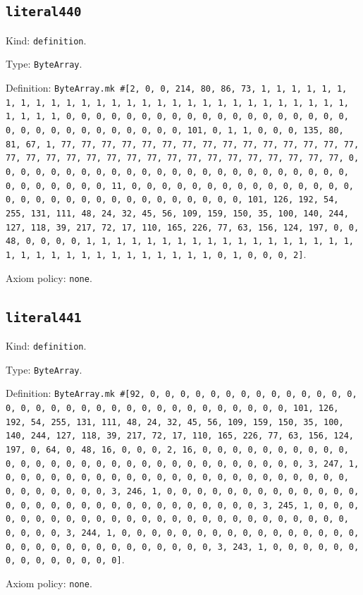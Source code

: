 \documentclass[11pt]{article}
\begin{document}
\subsection*{\texttt{literal440}}
\noindent Kind: \texttt{definition}.\par
\noindent Type: \texttt{ByteArray}.\par
\noindent Definition: \texttt{ByteArray.mk \#[2, 0, 0, 214, 80, 86, 73, 1, 1, 1, 1, 1, 1, 1, 1, 1, 1, 1, 1, 1, 1, 1, 1, 1, 1, 1, 1, 1, 1, 1, 1, 1, 1, 1, 1, 1, 1, 1, 1, 1, 0, 0, 0, 0, 0, 0, 0, 0, 0, 0, 0, 0, 0, 0, 0, 0, 0, 0, 0, 0, 0, 0, 0, 0, 0, 0, 0, 0, 0, 0, 0, 101, 0, 1, 1, 0, 0, 0, 135, 80, 81, 67, 1, 77, 77, 77, 77, 77, 77, 77, 77, 77, 77, 77, 77, 77, 77, 77, 77, 77, 77, 77, 77, 77, 77, 77, 77, 77, 77, 77, 77, 77, 77, 77, 77, 0, 0, 0, 0, 0, 0, 0, 0, 0, 0, 0, 0, 0, 0, 0, 0, 0, 0, 0, 0, 0, 0, 0, 0, 0, 0, 0, 0, 0, 0, 0, 11, 0, 0, 0, 0, 0, 0, 0, 0, 0, 0, 0, 0, 0, 0, 0, 0, 0, 0, 0, 0, 0, 0, 0, 0, 0, 0, 0, 0, 0, 0, 0, 101, 126, 192, 54, 255, 131, 111, 48, 24, 32, 45, 56, 109, 159, 150, 35, 100, 140, 244, 127, 118, 39, 217, 72, 17, 110, 165, 226, 77, 63, 156, 124, 197, 0, 0, 48, 0, 0, 0, 0, 1, 1, 1, 1, 1, 1, 1, 1, 1, 1, 1, 1, 1, 1, 1, 1, 1, 1, 1, 1, 1, 1, 1, 1, 1, 1, 1, 1, 1, 1, 1, 1, 0, 1, 0, 0, 0, 2]}.\par
\noindent Axiom policy: \texttt{none}.\par
\subsection*{\texttt{literal441}}
\noindent Kind: \texttt{definition}.\par
\noindent Type: \texttt{ByteArray}.\par
\noindent Definition: \texttt{ByteArray.mk \#[92, 0, 0, 0, 0, 0, 0, 0, 0, 0, 0, 0, 0, 0, 0, 0, 0, 0, 0, 0, 0, 0, 0, 0, 0, 0, 0, 0, 0, 0, 0, 0, 0, 0, 101, 126, 192, 54, 255, 131, 111, 48, 24, 32, 45, 56, 109, 159, 150, 35, 100, 140, 244, 127, 118, 39, 217, 72, 17, 110, 165, 226, 77, 63, 156, 124, 197, 0, 64, 0, 48, 16, 0, 0, 0, 2, 16, 0, 0, 0, 0, 0, 0, 0, 0, 0, 0, 0, 0, 0, 0, 0, 0, 0, 0, 0, 0, 0, 0, 0, 0, 0, 0, 0, 0, 0, 0, 3, 247, 1, 0, 0, 0, 0, 0, 0, 0, 0, 0, 0, 0, 0, 0, 0, 0, 0, 0, 0, 0, 0, 0, 0, 0, 0, 0, 0, 0, 0, 0, 0, 3, 246, 1, 0, 0, 0, 0, 0, 0, 0, 0, 0, 0, 0, 0, 0, 0, 0, 0, 0, 0, 0, 0, 0, 0, 0, 0, 0, 0, 0, 0, 0, 0, 3, 245, 1, 0, 0, 0, 0, 0, 0, 0, 0, 0, 0, 0, 0, 0, 0, 0, 0, 0, 0, 0, 0, 0, 0, 0, 0, 0, 0, 0, 0, 0, 0, 3, 244, 1, 0, 0, 0, 0, 0, 0, 0, 0, 0, 0, 0, 0, 0, 0, 0, 0, 0, 0, 0, 0, 0, 0, 0, 0, 0, 0, 0, 0, 0, 0, 3, 243, 1, 0, 0, 0, 0, 0, 0, 0, 0, 0, 0, 0, 0, 0, 0]}.\par
\noindent Axiom policy: \texttt{none}.\par
\end{document}
